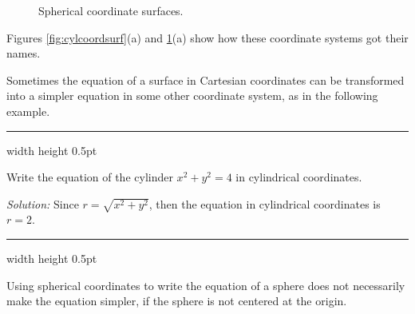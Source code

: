 \begin{figure}[h]
{}
 \caption[]{\quad Spherical coordinate surfaces.}
 \label{fig:sphcoordsurf}
\end{figure}

Figures \ref{fig:cylcoordsurf}(a) and \ref{fig:sphcoordsurf}(a) show how these coordinate systems got their names.

Sometimes the equation of a surface in Cartesian coordinates can be transformed into a simpler equation in some other
coordinate system, as in the following example.

\smallskip
\hrule width \textwidth height 0.5pt
\begin{exmp}
 Write the equation of the cylinder $x^2 + y^2 = 4$ in cylindrical coordinates.\smallskip
 \par\noindent \emph{Solution:} Since $r = \sqrt{x^2 + y^2}$, then the equation in cylindrical
 coordinates is $r =2$.
\end{exmp}
\hrule width \textwidth height 0.5pt
\smallskip

Using spherical coordinates to write the equation of a sphere does not necessarily make the
equation simpler, if the sphere is not centered at the origin.

